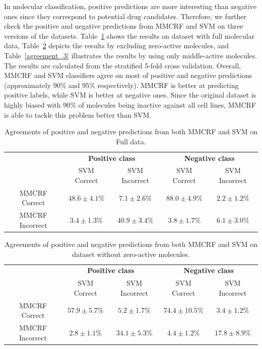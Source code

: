 \documentclass[english]{tktltiki}
\begin{document}
In molecular classification, positive predictions are more interesting than negative ones since they correspond to potential drug candidates. Therefore, we further check the positive and negative predictions from MMCRF and SVM on three versions of the datasets. Table~\ref{agreement_1} shows the results on dataset with full molecular data, Table~\ref{agreement_2} depicts the results by excluding zero-active molecules, and Table~\ref{agreement_3} illustrates the results by using only middle-active molecules. The results are calculated from the stratified 5-fold cross validation. Overall, MMCRF and SVM classifiers agree on most of positive and negative predictions (approximately $90\%$ and $95\%$ respectively). MMCRF is better at predicting positive labels, while SVM is better at negative ones. Since the original dataset is highly biased with $90\%$ of molecules being inactive against all cell lines, MMCRF is able to tackle this problem better than SVM.	

\begin{table}[t]\small
\begin{tabular}{|c||c|c||c|c|} \hline
 &  \multicolumn{2}{|c||}{\bf Positive class} &  \multicolumn{2}{|c|}{\bf Negative class}\\ \cline{2-5}
 	                       & SVM Correct & SVM Incorrect & SVM Correct & SVM Incorrect \\  \hline
MMCRF  Correct  & $48.6 \pm 4.1\%$ & $7.1 \pm 2.6\%$ & $88.0 \pm 4.9\%$ & $2.2 \pm 1.2\%$ \\ \hline
MMCRF Incorrect & $3.4 \pm 1.3\%$ & $40.9 \pm 3.4\%$ & $3.8 \pm 1.7\%$ &  $6.1 \pm 3.0\%$ \\ \hline
\end{tabular} 
\caption[Prediction agreements from MMCRF and SVM 1.]{Agreements of positive and negative predictions from both MMCRF and SVM on Full data.}
\label{agreement_1}
\end{table}

\begin{table}[t]\small
\begin{tabular}{|c||c|c||c|c|} \hline
 &  \multicolumn{2}{|c||}{\bf Positive class} &  \multicolumn{2}{|c|}{\bf Negative class}\\ \cline{2-5}
 	                       & SVM Correct & SVM Incorrect & SVM Correct & SVM Incorrect \\  \hline
MMCRF  Correct  & $57.9 \pm 5.7\%$ & $5.2 \pm 1.7\%$ & $74.4 \pm 10.5\%$ & $3.4 \pm 1.2\%$ \\ \hline
MMCRF Incorrect & $2.8 \pm 1.1\%$ & $34.1 \pm 5.3\%$ & $4.4 \pm 1.2\%$ &  $17.8 \pm 8.9\%$ \\ \hline
\end{tabular} 
\caption[Prediction agreements from MMCRF and SVM 2.]{Agreements of positive and negative predictions from both MMCRF and SVM on dataset without zero-active molecules.}
\label{agreement_2}
\end{table}
\end{document}
